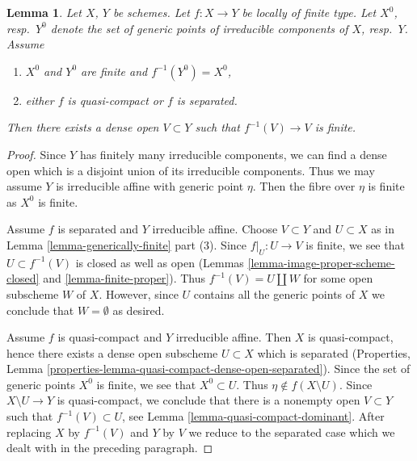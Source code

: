 \documentclass[10pt,a4paper]{amsart}
\theoremstyle{plain}
\newtheorem{lemma}[subsection]{Lemma}
\theoremstyle{definition}
\theoremstyle{remark}
\numberwithin{equation}{subsection}
\begin{document}
\begin{lemma}
\label{lemma-finite-over-dense-open}
Let $X$, $Y$ be schemes. Let $f : X \to Y$ be locally of finite type.
Let $X^0$, resp.\ $Y^0$ denote the set of generic points of irreducible
components of $X$, resp.\ $Y$. Assume
\begin{enumerate}
\item $X^0$ and $Y^0$ are finite and $f^{-1}(Y^0) = X^0$,
\item either $f$ is quasi-compact or $f$ is separated.
\end{enumerate}
Then there exists a dense open $V \subset Y$
such that $f^{-1}(V) \to V$ is finite.
\end{lemma}

\begin{proof}
Since $Y$ has finitely many irreducible components, we can find a dense
open which is a disjoint union of its irreducible components. Thus we may
assume $Y$ is irreducible affine with generic point $\eta$. Then the fibre
over $\eta$ is finite as $X^0$ is finite.

\medskip\noindent
Assume $f$ is separated and $Y$ irreducible affine. Choose $V \subset Y$
and $U \subset X$ as in Lemma \ref{lemma-generically-finite} part (3).
Since $f|_U : U \to V$ is finite, we see that $U \subset f^{-1}(V)$
is closed as well as open (Lemmas \ref{lemma-image-proper-scheme-closed} and
\ref{lemma-finite-proper}). Thus $f^{-1}(V) = U \amalg W$ for some
open subscheme $W$ of $X$. However, since $U$ contains all the generic
points of $X$ we conclude that $W = \emptyset$ as desired.

\medskip\noindent
Assume $f$ is quasi-compact and $Y$ irreducible affine. Then $X$ is
quasi-compact, hence there exists a dense open subscheme $U \subset X$
which is separated
(Properties, Lemma \ref{properties-lemma-quasi-compact-dense-open-separated}).
Since the set of generic points $X^0$ is finite, we see that $X^0 \subset U$.
Thus $\eta \not \in f(X \setminus U)$. Since $X \setminus U \to Y$ is
quasi-compact, we conclude that there is a nonempty open $V \subset Y$
such that $f^{-1}(V) \subset U$, see Lemma \ref{lemma-quasi-compact-dominant}.
After replacing $X$ by $f^{-1}(V)$ and $Y$ by $V$ we reduce to the
separated case which we dealt with in the preceding paragraph.
\end{proof}
\end{document}
